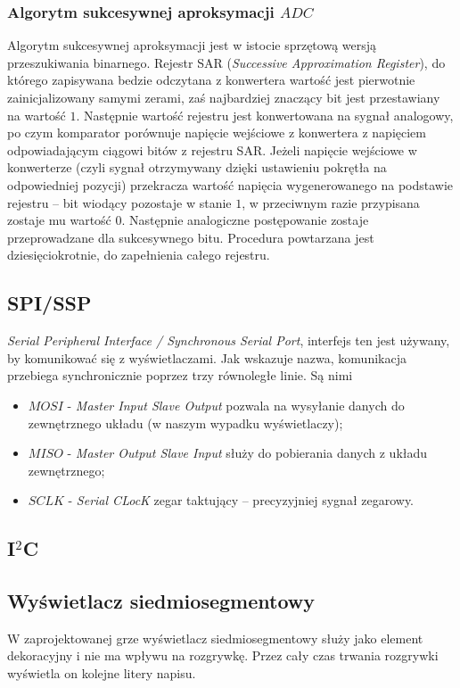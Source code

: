 \documentclass[a4paper,12pt,twoside]{article}
\theoremstyle{plain}
\theoremstyle{definition}
\theoremstyle{remark}
\begin{document}
	\subsubsection{Algorytm sukcesywnej aproksymacji $ADC$ \cite{ADCINST}}
	Algorytm sukcesywnej aproksymacji jest w istocie sprzętową wersją przeszukiwania binarnego. Rejestr SAR (\textit{Successive Approximation Register}), do którego zapisywana bedzie odczytana z konwertera wartość jest pierwotnie zainicjalizowany samymi zerami, zaś najbardziej znaczący bit jest przestawiany na wartość $1$. Następnie wartość rejestru jest konwertowana na sygnał analogowy, po czym komparator porównuje napięcie wejściowe z konwertera z napięciem odpowiadającym ciągowi bitów z rejestru SAR. Jeżeli napięcie wejściowe w konwerterze (czyli sygnał otrzymywany dzięki ustawieniu pokrętła na odpowiedniej pozycji) przekracza wartość napięcia wygenerowanego na podstawie rejestru -- bit wiodący pozostaje w stanie $1$, w przeciwnym razie przypisana zostaje mu wartość $0$. Następnie analogiczne postępowanie zostaje przeprowadzane dla sukcesywnego bitu. Procedura powtarzana jest dziesięciokrotnie, do zapełnienia całego rejestru.

\subsection{SPI/SSP}
\textit{Serial Peripheral Interface / Synchronous Serial Port}, interfejs ten jest używany, by komunikować się z wyświetlaczami. Jak wskazuje nazwa, komunikacja przebiega synchronicznie poprzez trzy równoległe linie. Są nimi
\begin{itemize}
	\item $MOSI$ - \textit{Master Input Slave Output} pozwala na wysyłanie danych do zewnętrznego układu (w naszym wypadku wyświetlaczy);
	\item $MISO$ - \textit{Master Output Slave Input} służy do pobierania danych z układu zewnętrznego;
	\item $SCLK$ - \textit{Serial CLocK} zegar taktujący -- precyzyjniej sygnał zegarowy.
\end{itemize}

\subsection{I$^2$C}

\subsection{Wyświetlacz siedmiosegmentowy}
W zaprojektowanej grze wyświetlacz siedmiosegmentowy służy jako element dekoracyjny i nie ma wpływu na rozgrywkę. Przez cały czas trwania rozgrywki wyświetla on kolejne litery napisu.
\end{document}
